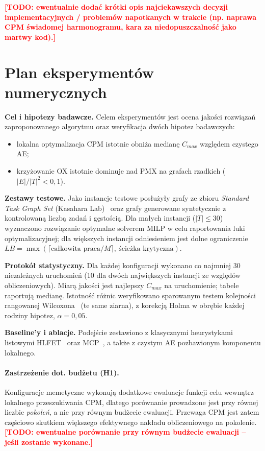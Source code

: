 \documentclass[12pt,a4paper]{article}
\newcommand{\todo}[1]{\textcolor{red}{\textbf{[TODO: #1]}}}
\begin{document}
\todo{ewentualnie dodać krótki opis najciekawszych decyzji implementacyjnych / problemów napotkanych w trakcie (np. naprawa CPM świadomej harmonogramu, kara za niedopuszczalność jako martwy kod).}

\section{Plan eksperymentów numerycznych}
\label{sec:eksperymenty}
\textbf{Cel i hipotezy badawcze.} Celem eksperymentów jest ocena jakości rozwiązań zaproponowanego algorytmu oraz weryfikacja dwóch hipotez badawczych:
\begin{itemize}[itemsep=1pt, topsep=2pt, leftmargin=3em]
    \item[(H1)] lokalna optymalizacja CPM istotnie obniża medianę $C_{max}$ względem czystego AE;
    \item[(H2)] krzyżowanie OX istotnie dominuje nad PMX na grafach rzadkich ($|E|/|T|^2 < 0{,}1$).
\end{itemize}
\par\medskip\noindent
\textbf{Zestawy testowe.} Jako instancje testowe posłużyły grafy ze zbioru \textit{Standard Task Graph Set} (Kasahara Lab)~\cite{tobita2002} oraz grafy generowane syntetycznie z kontrolowaną liczbą zadań i gęstością. Dla małych instancji ($|T| \leq 30$) wyznaczono rozwiązanie optymalne solverem MILP w celu raportowania luki optymalizacyjnej; dla większych instancji odniesieniem jest dolne ograniczenie $LB = \max(\lceil \text{całkowita praca}/M \rceil,\ \text{ścieżka krytyczna})$.
\par\medskip\noindent
\textbf{Protokół statystyczny.} Dla każdej konfiguracji wykonano co najmniej 30 niezależnych uruchomień (10 dla dwóch największych instancji ze względów obliczeniowych). Miarą jakości jest najlepszy $C_{max}$ na uruchomienie; tabele raportują medianę. Istotność różnic weryfikowano sparowanym testem kolejności rangowanej Wilcoxona~\cite{wilcoxon1945} (te same ziarna), z korekcją Holma w obrębie każdej rodziny hipotez, $\alpha = 0{,}05$.
\par\medskip\noindent
\textbf{Baseline'y i ablacje.} Podejście zestawiono z klasycznymi heurystykami listowymi HLFET~\cite{adam1974} oraz MCP~\cite{wu1990}, a także z czystym AE pozbawionym komponentu lokalnego.

\paragraph{Zastrzeżenie dot. budżetu (H1).} Konfiguracje memetyczne wykonują dodatkowe ewaluacje funkcji celu wewnątrz lokalnego przeszukiwania CPM, dlatego porównanie prowadzone jest przy równej liczbie \emph{pokoleń}, a nie przy równym budżecie ewaluacji. Przewaga CPM jest zatem częściowo skutkiem większego efektywnego nakładu obliczeniowego na pokolenie. \todo{ewentualne porównanie przy równym budżecie ewaluacji -- jeśli zostanie wykonane.}
\end{document}
